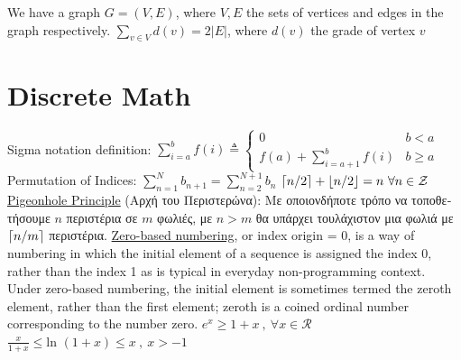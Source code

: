 \documentclass[12pt]{article}
\def\ln{\text{ln\ }} %
\DeclarePairedDelimiter{\ceil}{\lceil}{\rceil} %
\DeclarePairedDelimiter{\floor}{\lfloor}{\rfloor} %
\begin{document}
\begin{flushleft}
	\textbullet \quad We have a graph $G = (V, E) $, where $V, E$ the sets of vertices and edges in the graph respectively. \linebreak 
	$\displaystyle \sum \limits_{v\in V} d(v) = 2|E| $, where $d(v)$ the grade of vertex $v$ \linebreak 

	
	\pagebreak
	
	
	\section{Discrete Math}
	
	\textbullet \quad Sigma notation definition: $\sum \limits_{i=a}^b f(i) \triangleq 
			\begin{cases} 
				0 &b < a \\
				f(a) + \sum \limits_{i=a+1}^b f(i) & b\geq a						
			\end{cases} $ \linebreak 
	\textbullet \quad Permutation of Indices: $\sum \limits_{n=1}^N b_{n+1} = \sum \limits_{n=2}^{N+1} b_n$ \linebreak 
	\textbullet \quad $\ceil{n/2} + \floor{n/2} = n \ \forall n \in \mathcal{Z} $ \linebreak 
	\textbullet \quad \uline{Pigeonhole Principle} (\textgreek{Αρχή του Περιστερώνα}): \textgreek{Με οποιονδήποτε τρόπο να τοποθετήσουμε} $n$ \textgreek{περιστέρια σε $m$ φωλιές, με $n > m$ θα υπάρχει τουλάχιστον μια φωλιά με} $ \ceil{n/m} $ \textgreek{περιστέρια}. \linebreak 
	\textbullet \quad \uline{Zero-based numbering}, or index origin = $0$, is a way of numbering in which the initial element of a sequence is assigned the index 0, rather than the index 1 as is typical in everyday non-programming context. Under zero-based numbering, the initial element is sometimes termed the zeroth element, rather than the first element; zeroth is a coined ordinal number corresponding to the number zero. \linebreak 
	\textbullet \quad $ e^x \geq 1 + x \ , \ \forall x \in \mathcal{R} $ \linebreak 
	\textbullet \quad $ \frac{x}{1+x} \leq \ln(1+x) \leq x \ , \ x > -1 $ \linebreak 
	

\end{flushleft}
\end{document}
